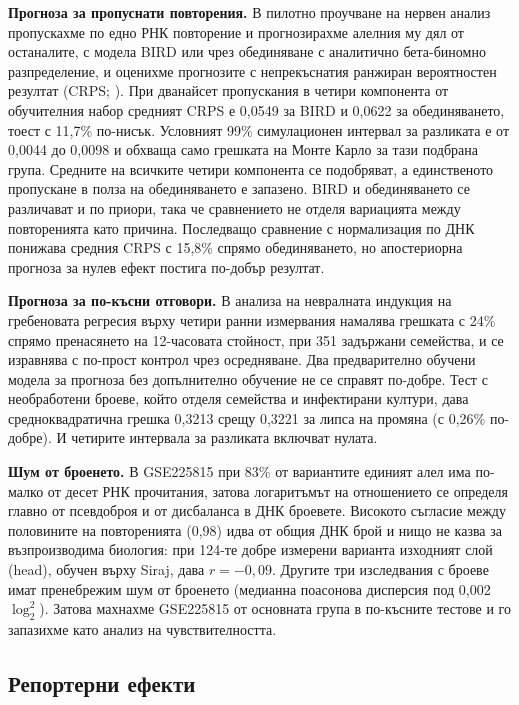 \documentclass[10.5pt,a4paper]{article}
\begin{document}
\textbf{Прогноза за пропуснати повторения.} В пилотно проучване на нервен анализ пропускахме по едно РНК повторение и прогнозирахме алелния му дял от останалите, с модела BIRD \citep{majoros2020} или чрез обединяване с аналитично бета-биномно разпределение, и оценихме прогнозите с непрекъснатия ранжиран вероятностен резултат (CRPS; \citealt{gneiting2007}). При дванайсет пропускания в четири компонента от обучителния набор средният CRPS е 0,0549 за BIRD и 0,0622 за обединяването, тоест с 11,7\% по-нисък. Условният 99\% симулационен интервал за разликата е от 0,0044 до 0,0098 и обхваща само грешката на Монте Карло за тази подбрана група. Средните на всичките четири компонента се подобряват, а единственото пропускане в полза на обединяването е запазено. BIRD и обединяването се различават и по приори, така че сравнението не отделя вариацията между повторенията като причина. Последващо сравнение с нормализация по ДНК понижава средния CRPS с 15,8\% спрямо обединяването, но апостериорна прогноза за нулев ефект постига по-добър резултат.

\textbf{Прогноза за по-късни отговори.} В анализа на невралната индукция на \citet{kreimer2022} гребеновата регресия върху четири ранни измервания намалява грешката с 24\% спрямо пренасянето на 12-часовата стойност, при 351 задържани семейства, и се изравнява с по-прост контрол чрез осредняване. Два предварително обучени модела за прогноза без допълнително обучение не се справят по-добре. Тест с необработени броеве, който отделя семейства и инфектирани култури, дава средноквадратична грешка 0,3213 срещу 0,3221 за липса на промяна (с 0,26\% по-добре). И четирите интервала за разликата включват нулата.

\textbf{Шум от броенето.} В GSE225815 при 83\% от вариантите единият алел има по-малко от десет РНК прочитания, затова логаритъмът на отношението се определя главно от псевдоброя и от дисбаланса в ДНК броевете. Високото съгласие между половините на повторенията (0,98) идва от общия ДНК брой и нищо не казва за възпроизводима биология: при 124-те добре измерени варианта изходният слой (head), обучен върху Siraj, дава $r=-0{,}09$. Другите три изследвания с броеве имат пренебрежим шум от броенето (медианна поасонова дисперсия под 0,002 $\log_2^2$). Затова махнахме GSE225815 от основната група в по-късните тестове и го запазихме като анализ на чувствителността.

\subsection{Репортерни ефекти}
\end{document}
